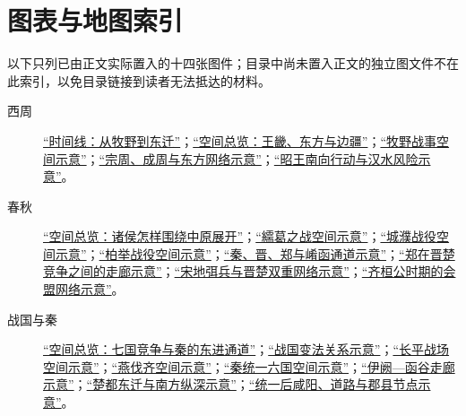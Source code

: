 \section{图表与地图索引}

以下只列已由正文实际置入的十四张图件；目录中尚未置入正文的独立图文件不在此索引，以免目录链接到读者无法抵达的材料。

\begin{description}
  \item[西周] \hyperref[fig:vol01:western-zhou:timeline]{“时间线：从牧野到东迁”}；\hyperref[fig:vol01:western-zhou:overview-map]{“空间总览：王畿、东方与边疆”}；\hyperref[fig:vol01:western-zhou:muye]{“牧野战事空间示意”}；\hyperref[fig:vol01:western-zhou:chengzhou]{“宗周、成周与东方网络示意”}；\hyperref[fig:vol01:western-zhou:zhao-southern-routes]{“昭王南向行动与汉水风险示意”}。
  \item[春秋] \hyperref[fig:vol01:spring-autumn:states-overview]{“空间总览：诸侯怎样围绕中原展开”}；\hyperref[fig:vol01:spring-autumn:xuge]{“繻葛之战空间示意”}；\hyperref[fig:vol01:spring-autumn:chengpu]{“城濮战役空间示意”}；\hyperref[fig:vol01:spring-autumn:boju]{“柏举战役空间示意”}；\hyperref[fig:vol01:spring-autumn:qin-jin-xiao-corridor]{“秦、晋、郑与崤函通道示意”}；\hyperref[fig:vol01:spring-autumn:zheng-between-jin-chu]{“郑在晋楚竞争之间的走廊示意”}；\hyperref[fig:vol01:spring-autumn:song-mibing-dual-network]{“宋地弭兵与晋楚双重网络示意”}；\hyperref[fig:vol01:spring-autumn:qi-huan-alliance-network]{“齐桓公时期的会盟网络示意”}。
  \item[战国与秦] \hyperref[fig:vol01:warring-qin:seven-states]{“空间总览：七国竞争与秦的东进通道”}；\hyperref[fig:vol01:warring-qin:reform-network]{“战国变法关系示意”}；\hyperref[fig:vol01:warring-qin:changping]{“长平战场空间示意”}；\hyperref[fig:vol01:warring-qin:yan-qi]{“燕伐齐空间示意”}；\hyperref[fig:vol01:warring-qin:qin-unification]{“秦统一六国空间示意”}；\hyperref[fig:vol01:warring-qin:yique-hangu-corridor]{“伊阙—函谷走廊示意”}；\hyperref[fig:vol01:warring-qin:chu-eastward-court]{“楚都东迁与南方纵深示意”}；\hyperref[fig:vol01:warring-qin:qin-commandery-road-hubs]{“统一后咸阳、道路与郡县节点示意”}。
\end{description}
